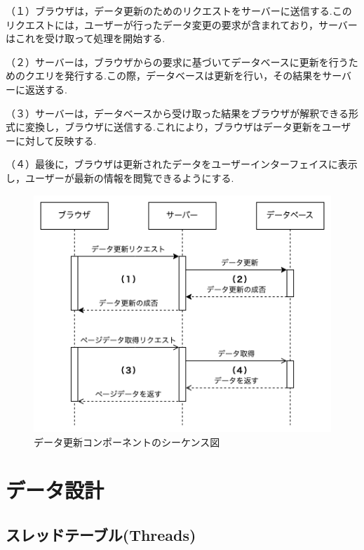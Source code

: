 \documentclass[b5paper,12pt,dvipdfmx]{jsreport}
\begin{document}
（１）ブラウザは，データ更新のためのリクエストをサーバーに送信する.このリクエストには，ユーザーが行ったデータ変更の要求が含まれており，サーバーはこれを受け取って処理を開始する.

（２）サーバーは，ブラウザからの要求に基づいてデータベースに更新を行うためのクエリを発行する.この際，データベースは更新を行い，その結果をサーバーに返送する.

（３）サーバーは，データベースから受け取った結果をブラウザが解釈できる形式に変換し，ブラウザに送信する.これにより，ブラウザはデータ更新をユーザーに対して反映する.

（４）最後に，ブラウザは更新されたデータをユーザーインターフェイスに表示し，ユーザーが最新の情報を閲覧できるようにする.


\begin{figure}[H]
    \centering
    \includegraphics[width=\textwidth]{./img/components/data_update_component_sequence_diagram.png}
    \caption{データ更新コンポーネントのシーケンス図}
    \label{data_update_component_sequence_diagram}
\end{figure}


\section{データ設計}

\subsection*{スレッドテーブル(Threads)}
\end{document}
